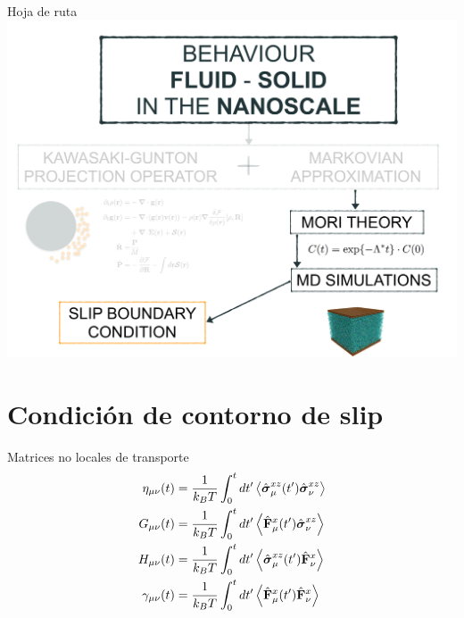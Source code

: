\documentclass{beamer}
\begin{document}
\begin{frame}{Hoja de ruta}
  \includegraphics[width=\linewidth]{scheme-thesis-slip}
\end{frame}


\section{Condición de contorno de slip}

\begin{frame}{Matrices no locales de transporte} 
\begin{align}
\eta_{\mu\nu}(t)
&=\frac{1}{k_BT}\int_0^t dt'
\left\langle \hat{\boldsymbol{\sigma}}^{xz}_{\mu}(t')\hat{\boldsymbol{\sigma}}^{xz}_{\nu}
\right\rangle
\nonumber\\
  G_{\mu\nu}(t)&=\frac{1}{k_BT}\int_0^t dt'
\left\langle\hat{\bf F}^x_\mu(t')
\hat{\boldsymbol{\sigma}}^{xz}_\nu
\right\rangle
\nonumber\\
H_{\mu\nu}(t)&=
\frac{1}{k_BT}\int_0^t dt'
\left\langle\hat{\boldsymbol{\sigma}}^{xz}_\mu(t')\hat{\bf F}^{x}_\nu\right\rangle
\nonumber\\
  \gamma_{\mu\nu}(t)
&=\frac{1}{k_BT}\int_0^t dt'
\left\langle 
\hat{\bf F}^{x}_\mu(t')
\hat{\bf F}^{x}_\nu\right\rangle
\nonumber
\end{align}
\end{frame}
\end{document}
